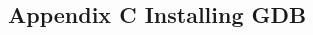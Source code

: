 \documentclass[class=book, crop=false]{standalone}
\begin{document}
\begin{CJK}{UTF8}{gbsn}

\chapter*{Appendix C Installing GDB}









\setcounter{section}{1}











\cleardoublepage

\end{CJK}
\end{document}
